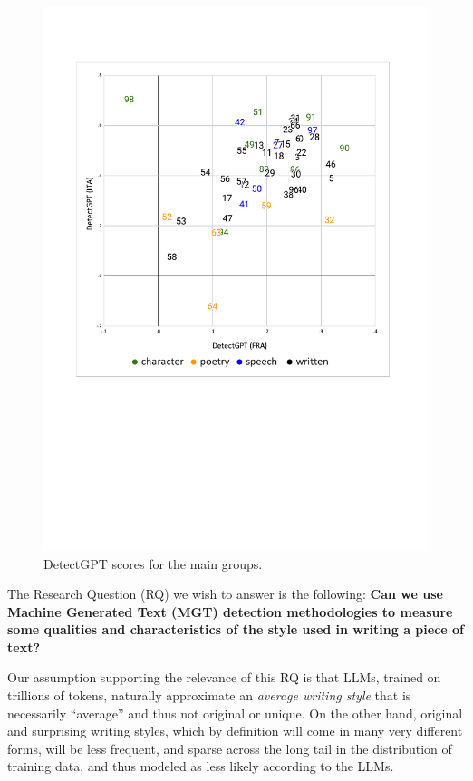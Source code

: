 \documentclass[
twocolumn,
]{ceurart}
\begin{document}
\begin{figure}
    \includegraphics[trim=0.5cm 0cm 0.5cm 0.5cm, clip, width=\columnwidth]{DetectGPT-zoom.pdf}
    \centering
    \caption{DetectGPT scores for the main groups.}
    \label{fig:dgpt_corr_ita_fra_zoom}
\end{figure}


The Research Question (RQ) we wish to answer is the following:
\textbf{Can we use Machine Generated Text (MGT) detection methodologies to measure some qualities and characteristics of the style used in writing a piece of text?}

Our assumption supporting the relevance of this RQ is that LLMs, trained on trillions of tokens, naturally approximate an \emph{average writing style} that is necessarily ``average'' and thus not original or unique. 
On the other hand, original and surprising writing styles, which by definition will come in many very different forms, will be less frequent, and sparse across the long tail in the distribution of training data, and thus modeled as less likely according to the LLMs.
\end{document}
